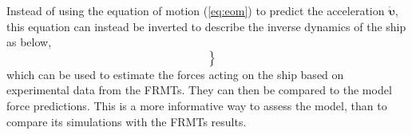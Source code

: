 \noindent Instead of using the equation of motion (\autoref{eq:eom}) to predict the acceleration $\pmb{\bm{\dot{\upsilon}}}$, this equation can instead be inverted to describe the inverse dynamics of the ship as below,
\begin{equation}
    \label{eq:ID_X}
    \left.\begin{aligned}
     \\
     \\
    
    \end{aligned}\right\}
\end{equation}
%     
%     
which can be used to estimate the forces acting on the ship based on experimental data from the FRMTs. They can then be compared to the model force predictions. This is a more informative way to assess the model, than to compare its simulations with the FRMTs results.